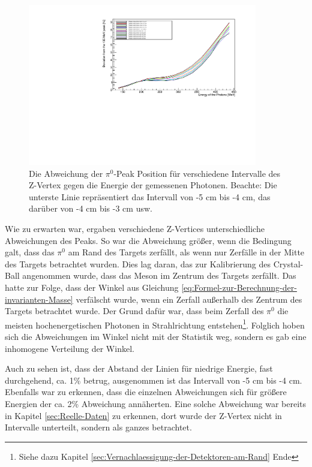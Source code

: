 \documentclass[a4paper,11pt,oneside,final,german,openbib,pdftex]{scrbook}
\begin{document}
{\begin{figure}[h!]
	\begin{center}
		\includegraphics[width=100mm]{20171804ZVertexDeviation}
		\caption{Die Abweichung der $\pi^0$-Peak Position für verschiedene Intervalle des Z-Vertex gegen die Energie der gemessenen Photonen. Beachte: Die unterste Linie repr\"asentiert das Intervall von -5 cm bis -4 cm, das dar\"uber von -4 cm bis -3 cm usw.}
		\label{fig:Z-Vertex-Multi-Graph}
	\end{center}
\end{figure}

Wie zu erwarten war, ergaben verschiedene Z-Vertices unterschiedliche Abweichungen des Peaks. So war die Abweichung gr\"o{\ss}er, wenn die Bedingung galt, dass das $\pi^0$ am Rand des Targets zerf\"allt, als wenn nur Zerf\"alle in der Mitte des Targets betrachtet wurden. Dies lag daran, das zur Kalibrierung des Crystal-Ball angenommen wurde, dass das Meson im Zentrum des Targets zerf\"allt. Das hatte zur Folge, dass der Winkel aus Gleichung \ref{eq:Formel-zur-Berechnung-der-invarianten-Masse} verf\"alscht wurde, wenn ein Zerfall au{\ss}erhalb des Zentrum des Targets betrachtet wurde. Der Grund daf\"ur war, dass beim Zerfall des $\pi^0$ die meisten hochenergetischen Photonen in Strahlrichtung entstehen\footnote{Siehe dazu Kapitel \ref{sec:Vernachlaessigung-der-Detektoren-am-Rand} Ende}. Folglich hoben sich die Abweichungen im Winkel nicht mit der Statistik weg, sondern es gab eine inhomogene Verteilung der Winkel. 
  
Auch zu sehen ist, dass der Abstand der Linien f\"ur niedrige Energie, fast durchgehend, ca. 1\% betrug, ausgenommen ist das Intervall von -5 cm bis -4 cm. Ebenfalls war zu erkennen, dass die einzelnen Abweichungen sich f\"ur gr\"o{\ss}ere Energien der ca. 2\% Abweichung ann\"aherten. Eine solche Abweichung war bereits in Kapitel \ref{sec:Reelle-Daten} zu erkennen, dort wurde der Z-Vertex nicht in Intervalle unterteilt, sondern als ganzes betrachtet.

}
\end{document}
